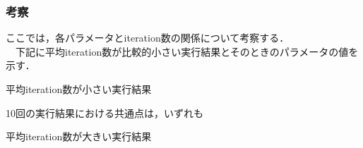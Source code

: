 \subsubsection{考察}
ここでは，各パラメータとiteration数の関係について考察する． \\
　下記に平均iteration数が比較的小さい実行結果とそのときのパラメータの値を示す．
\begin{itembox}[c]{平均iteration数が小さい実行結果}
    {\small
    }
\end{itembox}
10回の実行結果における共通点は，いずれも

\begin{itembox}[c]{平均iteration数が大きい実行結果}
    {\small
    }
\end{itembox}
